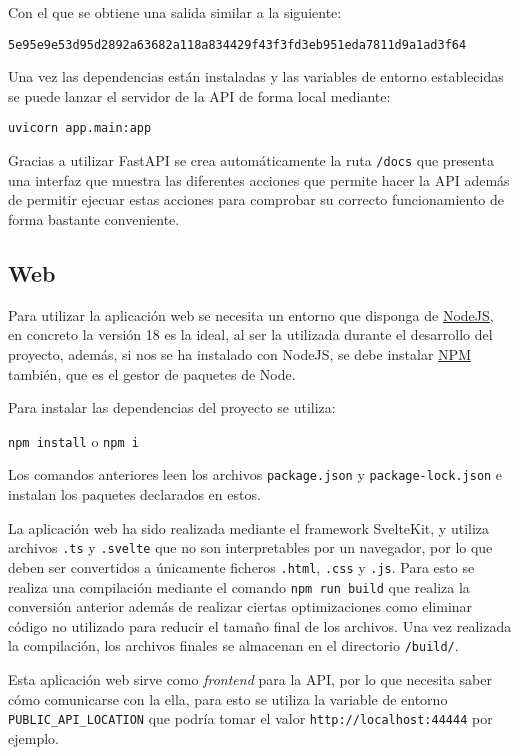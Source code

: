 Con el que se obtiene una salida similar a la siguiente:

\texttt{5e95e9e53d95d2892a63682a118a834429f43f3fd3eb951eda7811d9a1ad3f64}

Una vez las dependencias están instaladas y las variables de entorno
establecidas se puede lanzar el servidor de la API de forma local mediante:

\texttt{uvicorn app.main:app}

Gracias a utilizar FastAPI se crea automáticamente la ruta \texttt{/docs} que
presenta una interfaz que muestra las diferentes acciones que permite hacer la
API además de permitir ejecuar estas acciones para comprobar su correcto
funcionamiento de forma bastante conveniente.

\subsection{Web}

Para utilizar la aplicación web se necesita un entorno que disponga de
\href{https://nodejs.org/}{NodeJS}, en concreto la versión 18 es la ideal, al
ser la utilizada durante el desarrollo del proyecto, además, si nos se ha
instalado con NodeJS, se debe instalar \href{https://www.npmjs.com/}{NPM}
también, que es el gestor de paquetes de Node.

Para instalar las dependencias del proyecto se utiliza:

\texttt{npm install} o \texttt{npm i}

Los comandos anteriores leen los archivos \texttt{package.json} y
\texttt{package-lock.json} e instalan los paquetes declarados en estos.

La aplicación web ha sido realizada mediante el framework SvelteKit, y utiliza
archivos \texttt{.ts} y \texttt{.svelte} que no son interpretables por un
navegador, por lo que deben ser convertidos a únicamente ficheros
\texttt{.html}, \texttt{.css} y \texttt{.js}. Para esto se realiza una
compilación mediante el comando \texttt{npm run build} que realiza la conversión
anterior además de realizar ciertas optimizaciones como eliminar código no
utilizado para reducir el tamaño final de los archivos. Una vez realizada la
compilación, los archivos finales se almacenan en el directorio
\texttt{/build/}.

Esta aplicación web sirve como \textit{frontend} para la API, por lo que
necesita saber cómo comunicarse con la ella, para esto se utiliza la variable de
entorno \texttt{PUBLIC\_API\_LOCATION} que podría tomar el valor
\texttt{http://localhost:44444} por ejemplo.

